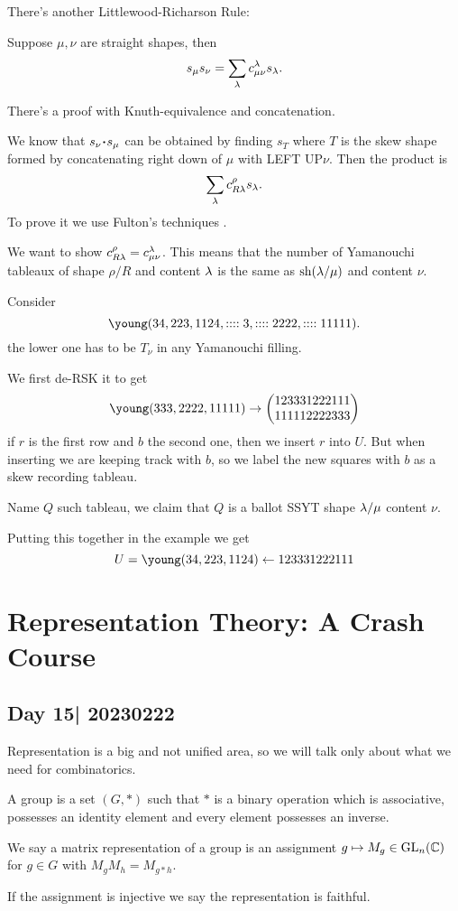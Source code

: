 \documentclass[12pt]{memoir}
\DeclareMathOperator{\sh}{sh}
\begin{document}
There's another Littlewood-Richarson Rule:

\begin{Th}
    Suppose $\mu,\nu$ are straight shapes, then 
    $$s_\mu s_\nu=\sum_{\lambda}c_{\mu\nu}^\lambda s_\lambda.$$
\end{Th}

There's a proof with Knuth-equivalence and concatenation.\par 
We know that $s_\nu\.s_\mu$ can be obtained by finding $s_T$ where $T$ is the skew shape formed by concatenating right down of $\mu$ with LEFT UP$\nu$. Then the product is 
$$\sum_{\lambda} c_{R\lambda}^\rho s_\lambda.$$
To prove it we use Fulton's techniques \cite{FultonYoungTab}.\par 
We want to show $c_{R\lambda}^{\rho}=c_{\mu\nu}^\lambda$. This means that the number of Yamanouchi tableaux of shape $\rho/R$ and content $\lambda$ is the same as $\sh(\la/\mu)$ and content $\nu$. 
\begin{Rmk}
    Consider 
    $$\young(34,223,1124,::::3,::::2222,::::11111).$$
    the lower one has to be $T_\nu$ in any Yamanouchi filling.
\end{Rmk}
We first de-RSK it to get 
$$\young(333,2222,11111)\to \twobyone{123331222111}{111112222333}$$
if $r$ is the first row and $b$ the second one, then we insert $r$ into $U$. But when inserting we are keeping track with $b$, so we label the new squares with $b$ as a skew recording tableau.\par 
Name $Q$ such tableau, we claim that $Q$ is a ballot SSYT shape $\lambda/\mu$ content $\nu$.\par 
Putting this together in the example we get 
$$U=\young(34,223,1124)\leftarrow 123331222111$$

\chapter{Representation Theory: A Crash Course}

\section{Day 15| 20230222}


Representation is a big and not unified area, so we will talk only about what we need for combinatorics.

\begin{Def}
    A group is a set $(G,\ast)$ such that $\ast$ is a binary operation which is associative, possesses an identity element and every element possesses an inverse.\par 
    We say a matrix representation of a group is an assignment $g\mapsto M_g\in\operatorname{GL}_n(\mathbb{C})$ for $g\in G$ with $M_gM_h=M_{g\ast h}$.\par 
    If the assignment is injective we say the representation is faithful.
\end{Def}
\end{document}
